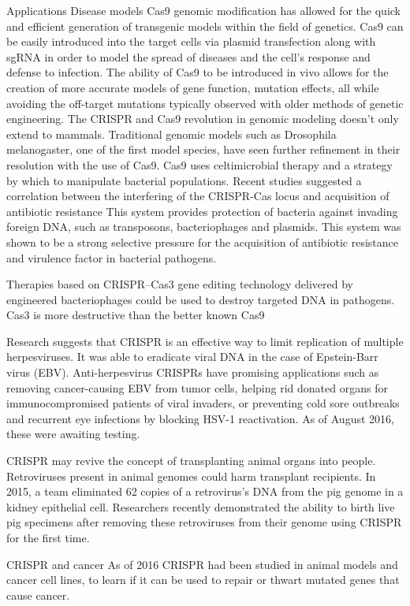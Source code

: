 Applications
Disease models
Cas9 genomic modification has allowed for the quick and efficient generation of transgenic models within the field of genetics. Cas9 can be easily introduced into the target cells via plasmid transfection along with sgRNA in order to model the spread of diseases and the cell's response and defense to infection. The ability of Cas9 to be introduced in vivo allows for the creation of more accurate models of gene function, mutation effects, all while avoiding the off-target mutations typically observed with older methods of genetic engineering. The CRISPR and Cas9 revolution in genomic modeling doesn't only extend to mammals. Traditional genomic models such as Drosophila melanogaster, one of the first model species, have seen further refinement in their resolution with the use of Cas9. Cas9 uses celtimicrobial therapy and a strategy by which to manipulate bacterial populations. Recent studies suggested a correlation between the interfering of the CRISPR-Cas locus and acquisition of antibiotic resistance This system provides protection of bacteria against invading foreign DNA, such as transposons, bacteriophages and plasmids. This system was shown to be a strong selective pressure for the acquisition of antibiotic resistance and virulence factor in bacterial pathogens.

Therapies based on CRISPR--Cas3 gene editing technology delivered by engineered bacteriophages could be used to destroy targeted DNA in pathogens. Cas3 is more destructive than the better known Cas9

Research suggests that CRISPR is an effective way to limit replication of multiple herpesviruses. It was able to eradicate viral DNA in the case of Epstein-Barr virus (EBV). Anti-herpesvirus CRISPRs have promising applications such as removing cancer-causing EBV from tumor cells, helping rid donated organs for immunocompromised patients of viral invaders, or preventing cold sore outbreaks and recurrent eye infections by blocking HSV-1 reactivation. As of August 2016, these were awaiting testing.

CRISPR may revive the concept of transplanting animal organs into people. Retroviruses present in animal genomes could harm transplant recipients. In 2015, a team eliminated 62 copies of a retrovirus's DNA from the pig genome in a kidney epithelial cell. Researchers recently demonstrated the ability to birth live pig specimens after removing these retroviruses from their genome using CRISPR for the first time.

CRISPR and cancer
As of 2016 CRISPR had been studied in animal models and cancer cell lines, to learn if it can be used to repair or thwart mutated genes that cause cancer.

